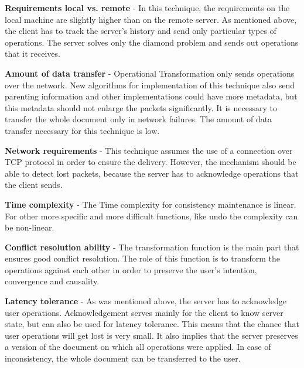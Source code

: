 \documentclass[12pt,oneside]{fithesis2}
\begin{document}
\vspace{3mm}

\textbf{Requirements local vs. remote} - In this technique, the requirements on the local machine are slightly higher than on the remote server. As mentioned above, the client has to track the server's history and send only particular types of operations. The server solves only the diamond problem and sends out operations that it receives.

\vspace{3mm}

\textbf{Amount of data transfer} - Operational Transformation only sends operations over the network. New algorithms for implementation of this technique also send parenting information and other implementations could have more metadata, but this metadata should not enlarge the packets significantly. It is necessary to transfer the whole document only in network failures. The amount of data transfer necessary for this technique is low.

\vspace{3mm}

\textbf{Network requirements} - This technique assumes the use of a connection over TCP protocol \cite{Jupiter}\cite{simplified} in order to ensure the delivery. However, the mechanism should be able to detect lost packets, because the server has to acknowledge operations that the client sends. 

\vspace{3mm}

\textbf{Time complexity} - The Time complexity for consistency maintenance is linear.\cite{sequence}\cite{orthogonal} For other more specific and more difficult functions, like undo the complexity can be non-linear.

\vspace{3mm}

\textbf{Conflict resolution ability} - The transformation function is the main part that ensures good conflict resolution. The role of this function is to transform the operations against each other in order to preserve the user's intention, convergence and causality.

\vspace{3mm}

\textbf{Latency tolerance} - As was mentioned above, the server has to acknowledge user operations. Acknowledgement serves mainly for the client to know server state, but can also be used for latency tolerance. This means that the chance that user operations will get lost is very small. It also implies that the server preserves a version of the document on which all operations were applied. In case of inconsistency, the whole document can be transferred to the user.
\end{document}
